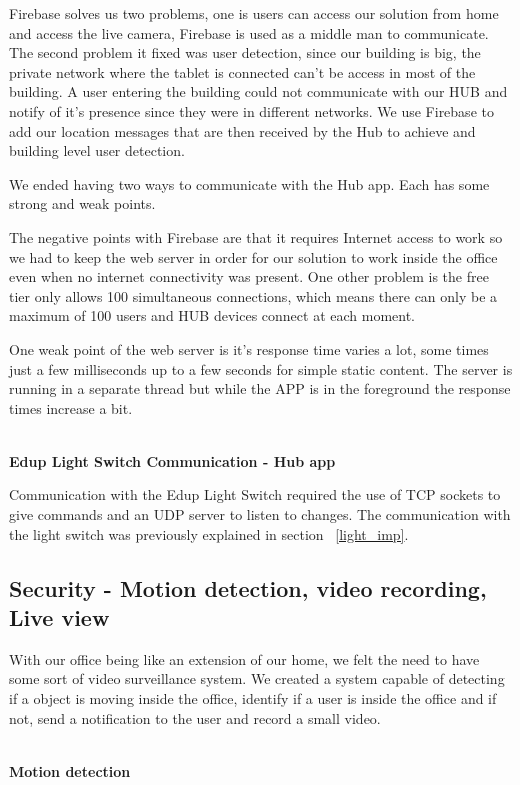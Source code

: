 Firebase solves us two problems, one is users can access our solution from home and access the live camera, Firebase is used as a middle man to communicate. The second problem it fixed was user detection, since our building is big, the private network where the tablet is connected can't be access in most of the building. A user entering the building could not communicate with our HUB and notify of it's presence since they were in different networks. We use Firebase to add our location messages that are then received by the Hub to achieve and building level user detection.

We ended having two ways to communicate with the Hub app. Each has some strong and weak points. 

The negative points with Firebase are that it requires Internet access to work so we had to keep the web server in order for our solution to work inside the office even when no internet connectivity was present. One other problem is the free tier only allows 100 simultaneous connections, which means there can only be a maximum of 100 users and HUB devices connect at each moment.

One weak point of the web server is it's response time varies a lot, some times just a few milliseconds up to a few seconds for simple static content. The server is running in a separate thread but while the APP is in the foreground the response times increase a bit.



\mbox{}\\
\textbf{Edup Light Switch Communication - Hub app}

Communication with the Edup Light Switch required the use of TCP sockets to give commands and an UDP server to listen to changes. The communication with the light switch was previously explained in section ~\ref{light_imp}.


\subsection{Security - Motion detection, video recording, Live view}\label{imp:security_motion}

With our office being like an extension of our home, we felt the need to have some sort of video surveillance system. We created a system capable of detecting if a object is moving inside the office, identify if a user is inside the office and if not, send a notification to the user and record a small video.


\mbox{}\\
\textbf{Motion detection}

